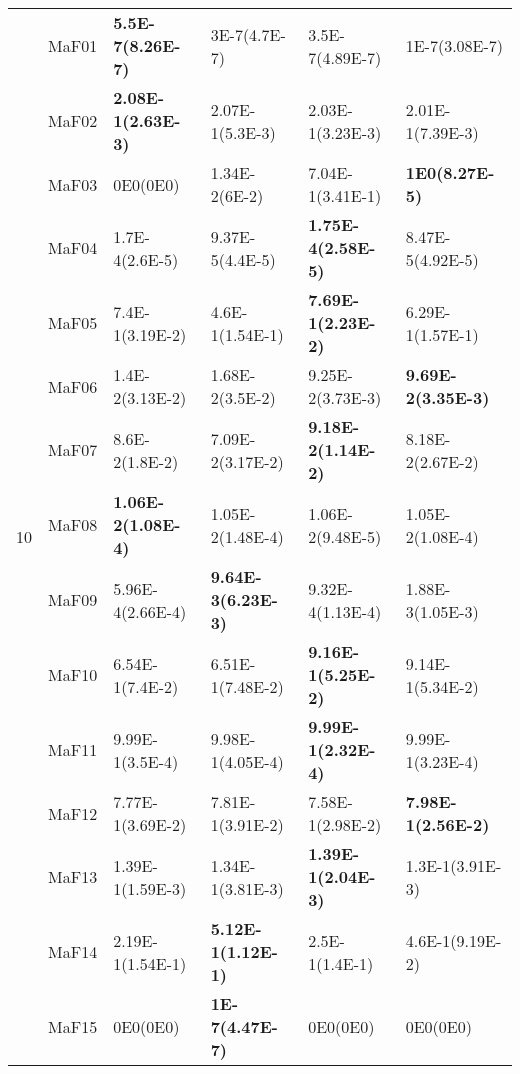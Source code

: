 \documentclass[]{article}
\begin{document}
\begin{table}
\begin{footnotesize}
\begin{tabular}{|l|l|l|l|l|l|}
\multirow{15}{*}{10} & MaF01 & \cellcolor{gray95} {\bf 5.5E-7(8.26E-7)} & \cellcolor{gray95} 3E-7(4.7E-7) & \cellcolor{gray95} 3.5E-7(4.89E-7) & \cellcolor{gray95} 1E-7(3.08E-7)\\
 & MaF02 & \cellcolor{gray95} {\bf 2.08E-1(2.63E-3)} & \cellcolor{gray95} 2.07E-1(5.3E-3) & 2.03E-1(3.23E-3) & 2.01E-1(7.39E-3)\\
 & MaF03 & 0E0(0E0) & 1.34E-2(6E-2) & 7.04E-1(3.41E-1) & \cellcolor{gray95} {\bf 1E0(8.27E-5)}\\
 & MaF04 & \cellcolor{gray95} 1.7E-4(2.6E-5) & 9.37E-5(4.4E-5) & \cellcolor{gray95} {\bf 1.75E-4(2.58E-5)} & 8.47E-5(4.92E-5)\\
 & MaF05 & \cellcolor{gray95} 7.4E-1(3.19E-2) & 4.6E-1(1.54E-1) & \cellcolor{gray95} {\bf 7.69E-1(2.23E-2)} & 6.29E-1(1.57E-1)\\
 & MaF06 & 1.4E-2(3.13E-2) & 1.68E-2(3.5E-2) & \cellcolor{gray95} 9.25E-2(3.73E-3) & \cellcolor{gray95} {\bf 9.69E-2(3.35E-3)}\\
 & MaF07 & \cellcolor{gray95} 8.6E-2(1.8E-2) & \cellcolor{gray95} 7.09E-2(3.17E-2) & \cellcolor{gray95} {\bf 9.18E-2(1.14E-2)} & \cellcolor{gray95} 8.18E-2(2.67E-2)\\
 & MaF08 & \cellcolor{gray95} {\bf 1.06E-2(1.08E-4)} & 1.05E-2(1.48E-4) & \cellcolor{gray95} 1.06E-2(9.48E-5) & 1.05E-2(1.08E-4)\\
 & MaF09 & 5.96E-4(2.66E-4) & \cellcolor{gray95} {\bf 9.64E-3(6.23E-3)} & 9.32E-4(1.13E-4) & 1.88E-3(1.05E-3)\\
 & MaF10 & 6.54E-1(7.4E-2) & 6.51E-1(7.48E-2) & \cellcolor{gray95} {\bf 9.16E-1(5.25E-2)} & \cellcolor{gray95} 9.14E-1(5.34E-2)\\
 & MaF11 & \cellcolor{gray95} 9.99E-1(3.5E-4) & 9.98E-1(4.05E-4) & \cellcolor{gray95} {\bf 9.99E-1(2.32E-4)} & 9.99E-1(3.23E-4)\\
 & MaF12 & \cellcolor{gray95} 7.77E-1(3.69E-2) & \cellcolor{gray95} 7.81E-1(3.91E-2) & 7.58E-1(2.98E-2) & \cellcolor{gray95} {\bf 7.98E-1(2.56E-2)}\\
 & MaF13 & \cellcolor{gray95} 1.39E-1(1.59E-3) & 1.34E-1(3.81E-3) & \cellcolor{gray95} {\bf 1.39E-1(2.04E-3)} & 1.3E-1(3.91E-3)\\
 & MaF14 & 2.19E-1(1.54E-1) & \cellcolor{gray95} {\bf 5.12E-1(1.12E-1)} & 2.5E-1(1.4E-1) & \cellcolor{gray95} 4.6E-1(9.19E-2)\\
 & MaF15 & \cellcolor{gray95} 0E0(0E0) & \cellcolor{gray95} {\bf 1E-7(4.47E-7)} & \cellcolor{gray95} 0E0(0E0) & \cellcolor{gray95} 0E0(0E0)\\
\hline


\end{tabular}
\end{footnotesize}
\end{table}
\end{document}
